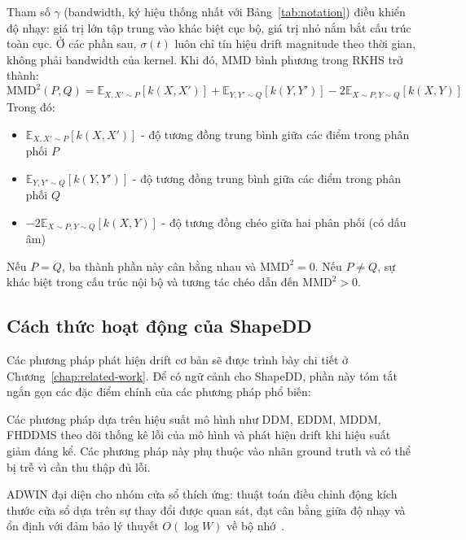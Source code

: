 Tham số $\gamma$ (bandwidth, ký hiệu thống nhất với Bảng~\ref{tab:notation}) điều khiển độ nhạy: giá trị lớn tập trung vào khác biệt cục bộ, giá trị nhỏ nắm bắt cấu trúc toàn cục. Ở các phần sau, $\sigma(t)$ luôn chỉ tín hiệu drift magnitude theo thời gian, không phải bandwidth của kernel.
Khi đó, MMD bình phương trong RKHS trở thành:
\begin{equation}
	\text{MMD}^2(P, Q) = \mathbb{E}_{X, X' \sim P}[k(X, X')] + \mathbb{E}_{Y, Y' \sim Q}[k(Y, Y')] - 2\mathbb{E}_{X \sim P, Y \sim Q}[k(X, Y)]
\end{equation}
Trong đó:
\begin{itemize}
	\item $\mathbb{E}_{X, X' \sim P}[k(X, X')]$ - độ tương đồng trung bình giữa các điểm trong phân phối $P$
	\item $\mathbb{E}_{Y, Y' \sim Q}[k(Y, Y')]$ - độ tương đồng trung bình giữa các điểm trong phân phối $Q$
	\item $-2\mathbb{E}_{X \sim P, Y \sim Q}[k(X, Y)]$ - độ tương đồng chéo giữa hai phân phối (có dấu âm)
\end{itemize}

Nếu $P = Q$, ba thành phần này cân bằng nhau và $\text{MMD}^2 = 0$. Nếu $P \neq Q$, sự khác biệt trong cấu trúc nội bộ và tương tác chéo dẫn đến $\text{MMD}^2 > 0$.

\subsection{Cách thức hoạt động của ShapeDD}

Các phương pháp phát hiện drift cơ bản sẽ được trình bày chi tiết ở Chương~\ref{chap:related-work}. Để có ngữ cảnh cho ShapeDD, phần này tóm tắt ngắn gọn các đặc điểm chính của các phương pháp phổ biến:

Các phương pháp dựa trên hiệu suất mô hình như DDM, EDDM, MDDM, FHDDMS theo dõi thống kê lỗi của mô hình và phát hiện drift khi hiệu suất giảm đáng kể. Các phương pháp này phụ thuộc vào nhãn ground truth và có thể bị trễ vì cần thu thập đủ lỗi.

ADWIN đại diện cho nhóm cửa sổ thích ứng: thuật toán điều chỉnh động kích thước cửa sổ dựa trên sự thay đổi được quan sát, đạt cân bằng giữa độ nhạy và ổn định với đảm bảo lý thuyết $O(\log W)$ về bộ nhớ~\cite{bifet2007learning}.

